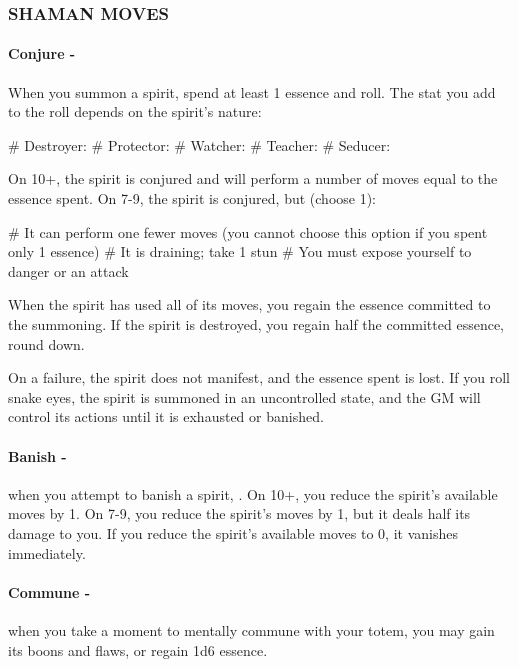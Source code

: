 \subsubsection{SHAMAN MOVES}
\paragraph{Conjure -} When you summon a spirit, spend at least 1 essence and roll. The stat you add to the roll depends on the spirit’s nature:
    \begin{easylist}
        # Destroyer: 
        # Protector: 
        # Watcher: 
        # Teacher: 
        # Seducer: 
    \end{easylist}

On 10+, the spirit is conjured and will perform a number of moves equal to the essence spent. On 7-9, the spirit is conjured, but (choose 1):
    \begin{easylist}
        # It can perform one fewer moves (you cannot choose this option if you spent only 1 essence)
        # It is draining; take 1 stun
        # You must expose yourself to danger or an attack
    \end{easylist}

When the spirit has used all of its moves, you regain the essence committed to the summoning. If the spirit is destroyed, you regain half the committed essence, round down.

On a failure, the spirit does not manifest, and the essence spent is lost. If you roll snake eyes, the spirit is summoned in an uncontrolled state, and the GM will control its actions until it is exhausted or banished.

\paragraph{Banish -} when you attempt to banish a spirit, . On 10+, you reduce the spirit’s available moves by 1. On 7-9, you reduce the spirit’s moves by 1, but it deals half its damage to you. If you reduce the spirit’s available moves to 0, it vanishes immediately.

\paragraph{Commune -} when you take a moment to mentally commune with your totem, you may gain its boons and flaws, or regain 1d6 essence.

